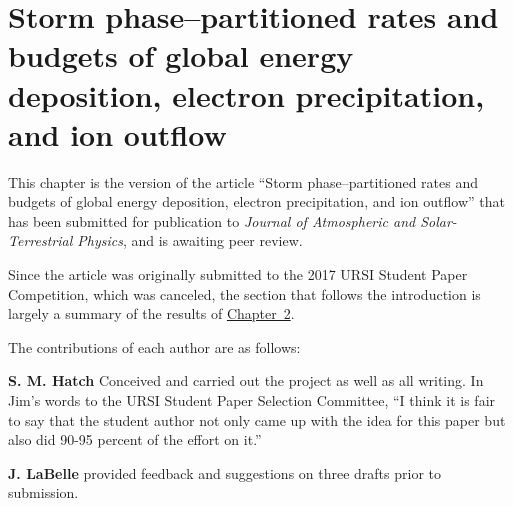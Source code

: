 
\chapter{Storm phase--partitioned rates and budgets of global \Alfic
  energy deposition, electron precipitation, and ion outflow}
\label{chp:3}

This chapter is the version of the article ``Storm phase--partitioned
rates and budgets of global \Alfic energy deposition, electron
precipitation, and ion outflow'' that has been submitted for
publication to \emph{Journal of Atmospheric and Solar-Terrestrial
  Physics}, and is awaiting peer review.

Since the article was originally submitted to the 2017 URSI Student
Paper Competition, which was canceled, the section that follows the
introduction is largely a summary of the results of
\hyperref[chp:2]{Chapter~2}.

The contributions of each author are as follows:

\textbf{S. M. Hatch} Conceived and carried out the project as well as
all writing. In Jim's words to the URSI Student Paper Selection
Committee, ``I think it is fair to say that the student author not
only came up with the idea for this paper but also did 90-95 percent
of the effort on it.''

\textbf{J. LaBelle} provided feedback and suggestions on three drafts
prior to submission.

